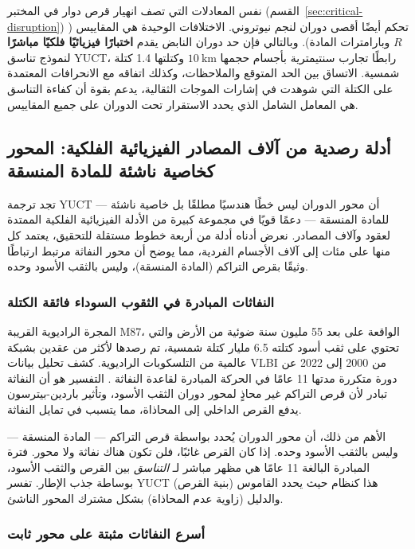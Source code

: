 \documentclass[12pt,a4paper]{article}
\begin{document}
	نفس المعادلات التي تصف انهيار قرص دوار في المختبر (القسم~\ref{sec:critical-disruption}) تحكم أيضًا أقصى دوران لنجم نيوتروني. الاختلافات الوحيدة هي المقاييس (\(R\) وبارامترات المادة). وبالتالي فإن حد دوران النابض يقدم \textbf{اختبارًا فيزيائيًا فلكيًا مباشرًا} لنموذج تناسق YUCT، رابطًا تجارب سنتيمترية بأجسام حجمها \(10\ \text{km}\) وكتلتها 1.4 كتلة شمسية. الاتساق بين الحد المتوقع والملاحظات، وكذلك اتفاقه مع الانحرافات المعتمدة على الكتلة التي شوهدت في إشارات الموجات الثقالية، يدعم بقوة أن كفاءة التناسق هي المعامل الشامل الذي يحدد الاستقرار تحت الدوران على جميع المقاييس.
	
	\subsection{أدلة رصدية من آلاف المصادر الفيزيائية الفلكية: المحور كخاصية ناشئة للمادة المنسقة}
	
	تجد ترجمة YUCT — أن محور الدوران ليس خطًا هندسيًا مطلقًا بل خاصية ناشئة للمادة المنسقة — دعمًا قويًا في مجموعة كبيرة من الأدلة الفيزيائية الفلكية الممتدة لعقود وآلاف المصادر. نعرض أدناه أدلة من أربعة خطوط مستقلة للتحقيق، يعتمد كل منها على مئات إلى آلاف الأجسام الفردية، مما يوضح أن محور النفاثة مرتبط ارتباطًا وثيقًا بقرص التراكم (المادة المنسقة)، وليس بالثقب الأسود وحده.
	
	\subsubsection{النفاثات المبادرة في الثقوب السوداء فائقة الكتلة}
	
	المجرة الراديوية القريبة M87، الواقعة على بعد 55 مليون سنة ضوئية من الأرض والتي تحتوي على ثقب أسود كتلته 6.5 مليار كتلة شمسية، تم رصدها لأكثر من عقدين بشبكة عالمية من التلسكوبات الراديوية. كشف تحليل بيانات VLBI من 2000 إلى 2022 عن دورة متكررة مدتها 11 عامًا في الحركة المبادرة لقاعدة النفاثة \cite{M87Precession2024}. التفسير هو أن النفاثة تبادر لأن قرص التراكم غير محاذٍ لمحور دوران الثقب الأسود، وتأثير باردين-بيترسون يدفع القرص الداخلي إلى المحاذاة، مما يتسبب في تمايل النفاثة.
	
	الأهم من ذلك، أن محور الدوران يُحدد بواسطة قرص التراكم — المادة المنسقة — وليس بالثقب الأسود وحده. إذا كان القرص غائبًا، فلن تكون هناك نفاثة ولا محور. فترة المبادرة البالغة 11 عامًا هي مظهر مباشر لـ \emph{التناسق} بين القرص والثقب الأسود، بوساطة جذب الإطار. تفسر YUCT هذا كنظام حيث يحدد القاموس (بنية القرص) والدليل (زاوية عدم المحاذاة) بشكل مشترك المحور الناشئ.
	
	\subsubsection{أسرع النفاثات مثبتة على محور ثابت}
	
\end{document}
